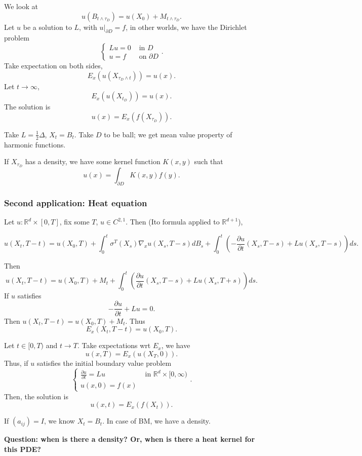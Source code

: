 We look at
\[
	u(B_{t \wedge \tau_D}) = u(X_0) + M_{t \wedge \tau_D}
.\] 
Let $u$ be a solution to $L$, with  $u|_{\partial D} = f$, in other worlds, we have the Dirichlet problem
\[
	\begin{cases}
		L u = 0 & \text{ in }D \\
		u = f & \text{ on }\partial D
	\end{cases}
.\] 
Take expectation on both sides,
\[
	E_x(u(X_{\tau_D \wedge t})) = u(x)
.\] 
Let $t \to  \infty $, 
\[
	E_x(u(X_{t_D})) = u(x)
.\] 
The solution is
\[
	u(x) = E_x\left( f(X_{\tau_D}) \right) 
.\] 

Take $L = \frac{1}{2} \Delta$, $X_t = B_t$. 
Take $D$ to be ball; we get mean value property of harmonic functions.

If $X_{\tau_D}$ has a density, we have some kernel function $K(x, y)$ such that
\[
	u(x) = \int _{\partial D} K(x,y) f(y)
.\] 

\subsubsection{Second application: Heat equation}

Let $u : \mathbb{R}^d \times [0,T]$, fix some $T$, $u \in C^{2, 1}$. Then (Ito formula applied to $\mathbb{R}^{d + 1}$),

\[
	u(X_t, T- t) = u(X_0, T) + \int _0^t \sigma^T(X_s) \nabla_x u(X_s, T - s) d B_s
	+ \int _0^t \left( - \frac{\partial u}{\partial t} (X_s, T - s) + L u(X_s, T - s) \right)  d s
.\] 

Then
\[
	u(X_t, T - t) = u(X_0, T) 
	+ M_t + \int _0^t \left( \frac{\partial u}{\partial t} (X_s, T - s) + L u(X_s, T + s) \right)  d s
.\] 
If $u$ satisfies
\[
	- \frac{\partial u}{\partial t} + L u = 0
.\] 
Then $u(X_t, T - t) = u(X_0, T) + M_t$. Thus
\[
	E_x(X_t, T - t) = u(X_0, T)
.\] 

Let $t \in  [0,T)$ and $t \to T$. Take expectations wrt $E_x$, we have
\[
	u(x, T) = E_x(u(X_T, 0))
.\] 
Thus, if $u$ satisfies the initial boundary value problem
\[
	\begin{cases}
		\frac{\partial u}{\partial t}  = L u  & \text{ in }\mathbb{R}^d \times [0,\infty )\\
		u(x, 0) = f(x)
	\end{cases}
.\] 
Then, the solution is 
\[
	u(x, t) = E_x(f(X_t))
.\] 

If $(a_{i j}) = I$, we know $X_t = B_t$. In case of BM, we have a density.

\textbf{Question: when is there a density? Or, when is there a heat kernel for this PDE?}

